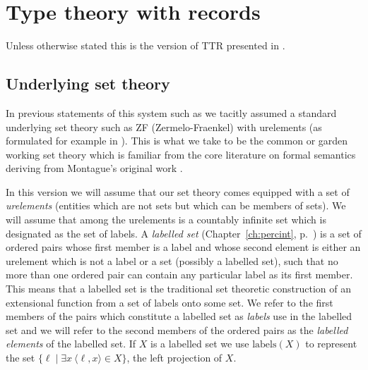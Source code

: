 \chapter{Type theory with records}
\label{app:ttr}

Unless otherwise stated this is the version of TTR presented in 
\cite{Cooper2012}.

 \section{Underlying set theory}
 \label{app:sets}
In previous statements of this system such as \cite{Cooper2012} we
tacitly assumed a standard underlying set theory such as ZF
(Zermelo-Fraenkel) with urelements (as formulated for example in \citealp{Suppes1960}).  This is what we take to be the
common or garden working set theory which is familiar from the core
literature on formal semantics deriving from Montague's original work
\citep{Montague1974}.  

In this version we
will assume that our set theory comes equipped with a set of
\textit{urelements} (entities which are not sets but which can be
members of sets).  We will assume that among the urelements is a countably infinite
set which is designated as the set of labels.  A \textit{labelled set}
(Chapter~\ref{ch:percint}, p.~\pageref{sec:labelled-sets}) is a set
of ordered pairs whose first member is a label and whose second
element is either an urelement which is not a label or a set (possibly a labelled
set), such that no more than one ordered pair can contain any
particular label as its first member.  This means that a labelled set
is the traditional set theoretic construction of an extensional
function from a set of labels onto some set.  We refer to the first members of the pairs which constitute a
labelled set as \textit{labels} use in the labelled set and we will refer to
the second members of the ordered pairs as the \textit{labelled
  elements} of the labelled set.  If $X$ is a labelled set we use
$\mathrm{labels}(X)$ to represent the set $\{\ell\mid\exists 
x\ \langle\ell,x\rangle\in X\}$, the left projection of $X$.

